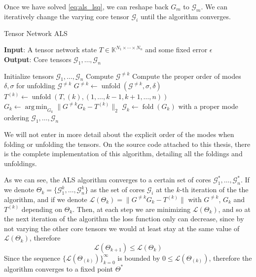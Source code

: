 \documentclass[11pt,a4paper,openright,oneside]{book}
\numberwithin{equation}{section}
\DeclareMathOperator{\unfolding}{unfold}
\DeclareMathOperator{\fold}{fold}
\DeclareMathOperator*{\argmin}{arg\,min}
\begin{document}
{Once we have solved \eqref{eq:als_lsq}, we can reshape back $G_m$ to $\mathcal{G}_m$.
We can iteratively change the varying core tensor $\mathcal{G}_i$ until the algorithm converges.

\begin{algorithm}[H]
    \caption{Tensor Network ALS}

    \hspace*{\algorithmicindent} \textbf{Input}: A tensor network state $T \in \mathbb{K}^{N_1 \times \cdots \times N_n}$ and some fixed error $\epsilon$ \\
    \hspace*{\algorithmicindent} \textbf{Output}: Core tensors $\mathcal{G}_1, \dots, \mathcal{G}_n$ 

    \begin{algorithmic}[1]
        \State Initialize tensors $\mathcal{G}_1, \dots, \mathcal{G}_n$
                \State Compute $\mathcal{G}^{\neq k}$
                \State Compute the proper order of modes $\delta, \sigma$ for unfolding $\mathcal{G}^{\neq k}$
                \State $G^{\neq k} \leftarrow \unfolding(\mathcal{G}^{\neq k}, \sigma, \delta)$
                \State $T^{(k)} \leftarrow \unfolding(T, (k), (1, \dots, k-1, k+1, \dots, n))$
                \State $G_k \leftarrow \argmin_{G_k} \|G^{\neq k} G_k - T^{(k)}\|_2$
                \State $\mathcal{G}_k \leftarrow \fold(G_k)$ with a proper mode ordering
            \EndFor
        \EndWhile
        \State \Return $\mathcal{G}_1, \dots, \mathcal{G}_n$

    \end{algorithmic}

\end{algorithm}

We will not enter in more detail about the explicit order of the modes when folding or unfolding the tensors. On the source code
attached to this thesis, there is the complete implementation of this algorithm, detailing all the foldings and unfoldings.

As we can see, the ALS algorithm converges to a certain set of cores $\mathcal{G}_1^*, \dots, \mathcal{G}_n^*$. If we denote
$\Theta_k = \{\mathcal{G}_1^k, \dots, \mathcal{G}_n^k\}$ as the set of cores $\mathcal{G}_i$ at the $k$-th iteration of the the algorithm,
and if we denote $\mathcal{L}(\Theta_k) = \|G^{\neq k} G_k - T^{(k)}\|$ with $G^{\neq k}$, $G_k$ and $T^{(k)}$ depending on $\Theta_k$. 
Then, at each step we are minimizing $\mathcal{L}(\Theta_k)$, and so at the next iteration of the algorithm the loss function
only can decrease, since by not varying the other core tensors we would at least stay at the same value of $\mathcal{L}(\Theta_k)$, therefore
$$\mathcal{L}(\Theta_{k+1}) \leqslant \mathcal{L}(\Theta_k)$$
Since the sequence $\{\mathcal{L}(\Theta_{(k)})\}_{k=0}^\infty$ is bounded by $0 \leqslant \mathcal{L}(\Theta_{(k)})$, therefore
the algorithm converges to a fixed point $\Theta^*$

}
\end{document}
